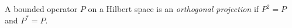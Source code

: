 
A bounded operator $P$ on a Hilbert space is an \emph{orthogonal projection} if $P^2=P$ and $P^*=P$.
